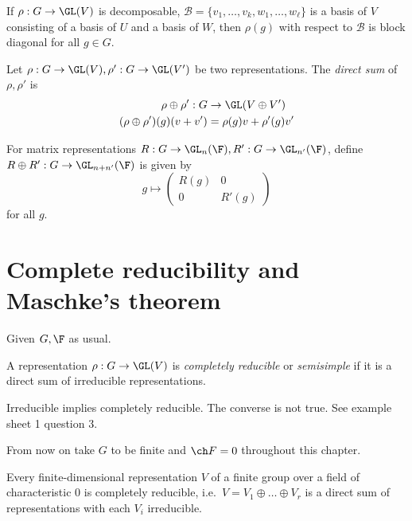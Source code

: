 \documentclass[a4paper]{article}
\theoremstyle{definition}
\begin{document}
\begin{lemma}
  If \(\rho: G \to \GL(V)\) is decomposable, \(\mathcal B = \{v_1, \dots, v_k, w_1, \dots, w_\ell\}\) is a basis of \(V\) consisting of a basis of \(U\) and a basis of \(W\), then \(\rho(g)\) with respect to \(\mathcal B\) is block diagonal for all \(g \in G\).
\end{lemma}

\begin{definition}
  Let \(\rho: G \to \GL(V), \rho': G \to \GL(V')\) be two representations. The \emph{direct sum} of \(\rho, \rho'\) is
  \begin{align*}
    \rho \oplus \rho': G &\to \GL(V \oplus V') \\
    (\rho \oplus \rho') (g) (v + v') &= \rho(g) v + \rho'(g) v'
  \end{align*}

  For matrix representations \(R: G \to \GL_n(\F), R': G \to \GL_{n'}(\F)\), define \(R \oplus R': G \to \GL_{n + n'}(\F)\) is given by
  \[
    g \mapsto
    \begin{pmatrix}
      R(g) & 0 \\
      0 & R'(g)
    \end{pmatrix}
  \]
  for all \(g\).
\end{definition}

\section{Complete reducibility and Maschke's theorem}

Given \(G, \F\) as usual.

\begin{definition}
  A representation \(\rho: G \to \GL(V)\) is \emph{completely reducible} or \emph{semisimple} if it is a direct sum of irreducible representations.
\end{definition}

\begin{remark}
  Irreducible implies completely reducible. The converse is not true. See example sheet 1 question 3.
\end{remark}

From now on take \(G\) to be finite and \(\ch F = 0\) throughout this chapter.

\begin{theorem}
  \label{thm:complete reducibility theorem}
  Every finite-dimensional representation \(V\) of a finite group over a field of characteristic \(0\) is completely reducible, i.e.\ \(V = V_1 \oplus \dots \oplus V_r\) is a direct sum of representations with each \(V_i\) irreducible.
\end{theorem}
\end{document}
